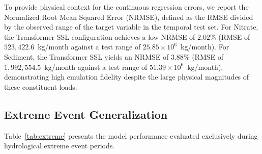 \documentclass[preprint,12pt]{elsarticle}
\begin{document}
To provide physical context for the continuous regression errors, we report the Normalized Root Mean Squared Error (NRMSE), defined as the RMSE divided by the observed range of the target variable in the temporal test set. For Nitrate, the Transformer SSL configuration achieves a low NRMSE of $2.02\%$ (RMSE of $523{,}422.6$~kg/month against a test range of $25.85 \times 10^6$~kg/month). For Sediment, the Transformer SSL yields an NRMSE of $3.88\%$ (RMSE of $1{,}992{,}554.5$~kg/month against a test range of $51.39 \times 10^6$~kg/month), demonstrating high emulation fidelity despite the large physical magnitudes of these constituent loads.

\subsection{Extreme Event Generalization}
Table~\ref{tab:extreme} presents the model performance evaluated exclusively during hydrological extreme event periods.

\begin{table}[H]
\centering
\caption{Extreme Event Robustness ($R^2$ Scores)}\label{tab:extreme}
\end{table}
\end{document}
